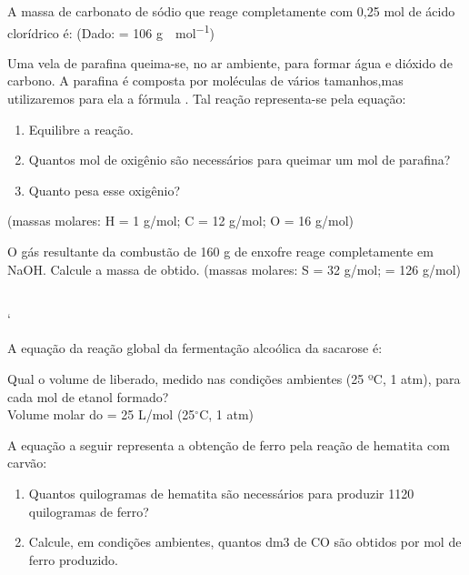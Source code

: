 \documentclass[a4paper,12]{exam}
\begin{document}
\begin{multicols}{2}
  	\begin{questions}

  		
A massa de carbonato de sódio que reage completamente com 0,25 mol de ácido clorídrico é: (Dado:  = 106 \si{g \cdot mol^{-1}})
\makeemptybox{2cm}

	  \question Uma vela de parafina queima-se, no ar ambiente, para formar água e dióxido de carbono. A parafina é composta por moléculas de vários tamanhos,mas utilizaremos para ela a fórmula . Tal reação representa-se pela equação:
	\begin{center}
	\end{center}
\begin{enumerate}[label=(\roman*)]
\item Equilibre a reação.
\makeemptybox{1cm}
\item Quantos mol de oxigênio são necessários para queimar um mol de parafina?
\makeemptybox{2cm}
\item Quanto pesa esse oxigênio?
\makeemptybox{2cm}
\end{enumerate}
(massas molares: H = 1 \si{g/mol}; C = 12 \si{g/mol}; O = 16 \si{g/mol})

		\question O gás resultante da combustão de 160 g de enxofre reage completamente em NaOH. Calcule a massa de  obtido. (massas
molares: S = 32 \si{g/mol};  = 126 \si{g/mol})
	\begin{center}
 \\
`
	\end{center}
\makeemptybox{2cm}


		\question A equação da reação global da fermentação alcoólica da sacarose é:		
	\begin{center}
	\end{center}
	Qual o volume de  liberado, medido nas condições ambientes (25 ºC, 1 atm), para cada mol de etanol formado? \\ Volume molar do  = 25 L/mol (25$^{\circ}$C, 1 atm)
	\makeemptybox{2cm}
	  
	 \question  A equação a seguir representa a obtenção de ferro pela reação de hematita com carvão:
	 \begin{center}
	 \end{center}
\begin{enumerate}[label=(\roman*)]
\item Quantos quilogramas de hematita são
necessários para produzir 1120 quilogramas de ferro?
\makeemptybox{2cm}
\item Calcule, em condições ambientes, quantos
dm3 de CO são obtidos por mol de ferro produzido.
\makeemptybox{2cm}
\end{enumerate}


\end{questions}
\end{multicols}
\end{document}
